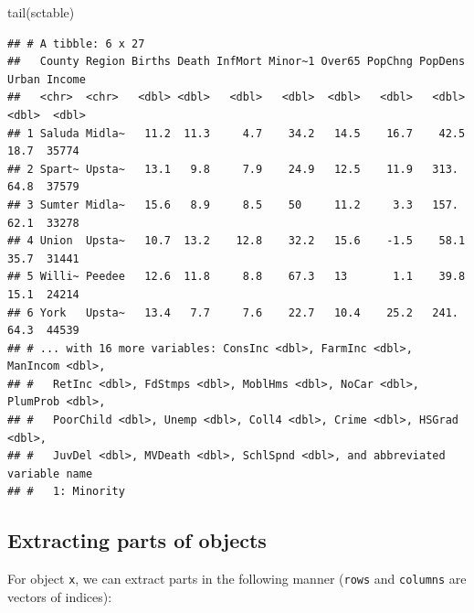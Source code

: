 \documentclass[
]{book}
\newenvironment{Shaded}{\begin{snugshade}}{\end{snugshade}}
\newcommand{\DecValTok}[1]{\textcolor[rgb]{0.00,0.00,0.81}{#1}}
\newcommand{\FunctionTok}[1]{\textcolor[rgb]{0.00,0.00,0.00}{#1}}
\newcommand{\NormalTok}[1]{#1}
\newcommand{\SpecialCharTok}[1]{\textcolor[rgb]{0.00,0.00,0.00}{#1}}
\newcommand{\StringTok}[1]{\textcolor[rgb]{0.31,0.60,0.02}{#1}}
\begin{document}
\begin{Shaded}
\begin{Highlighting}[]
\FunctionTok{tail}\NormalTok{(sctable)}
\end{Highlighting}
\end{Shaded}

\begin{verbatim}
## # A tibble: 6 x 27
##   County Region Births Death InfMort Minor~1 Over65 PopChng PopDens Urban Income
##   <chr>  <chr>   <dbl> <dbl>   <dbl>   <dbl>  <dbl>   <dbl>   <dbl> <dbl>  <dbl>
## 1 Saluda Midla~   11.2  11.3     4.7    34.2   14.5    16.7    42.5  18.7  35774
## 2 Spart~ Upsta~   13.1   9.8     7.9    24.9   12.5    11.9   313.   64.8  37579
## 3 Sumter Midla~   15.6   8.9     8.5    50     11.2     3.3   157.   62.1  33278
## 4 Union  Upsta~   10.7  13.2    12.8    32.2   15.6    -1.5    58.1  35.7  31441
## 5 Willi~ Peedee   12.6  11.8     8.8    67.3   13       1.1    39.8  15.1  24214
## 6 York   Upsta~   13.4   7.7     7.6    22.7   10.4    25.2   241.   64.3  44539
## # ... with 16 more variables: ConsInc <dbl>, FarmInc <dbl>, ManIncom <dbl>,
## #   RetInc <dbl>, FdStmps <dbl>, MoblHms <dbl>, NoCar <dbl>, PlumProb <dbl>,
## #   PoorChild <dbl>, Unemp <dbl>, Coll4 <dbl>, Crime <dbl>, HSGrad <dbl>,
## #   JuvDel <dbl>, MVDeath <dbl>, SchlSpnd <dbl>, and abbreviated variable name
## #   1: Minority
\end{verbatim}

\hypertarget{extracting-parts-of-objects}{%
\subsection*{Extracting parts of objects}\label{extracting-parts-of-objects}}

For object \texttt{x}, we can extract parts in the following manner (\texttt{rows} and \texttt{columns} are vectors of indices):

\begin{Shaded}
\end{Shaded}
\end{document}
